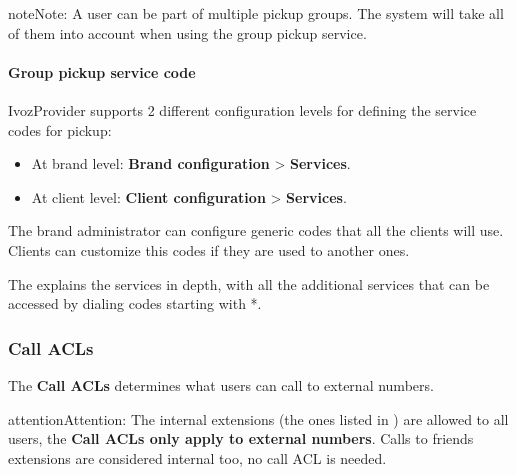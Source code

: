 \documentclass[letterpaper,10pt,english]{sphinxmanual}
\begin{document}
\begin{notice}{note}{Note:}
A user can be part of multiple pickup groups. The system will take
all of them into account when using the group pickup service.
\end{notice}


\paragraph{Group pickup service code}
\label{administration_portal/client/vpbx/user_configuration/pick_up_groups:group-pickup-service-code}
IvozProvider supports 2 different configuration levels for defining the service
codes for pickup:
\begin{itemize}
\item {} 
At brand level: \textbf{Brand configuration} \textgreater{} \textbf{Services}.

\item {} 
At client level: \textbf{Client configuration} \textgreater{} \textbf{Services}.

\end{itemize}

The brand administrator can configure generic codes that all the clients will
use. Clients can customize this codes if they are used to another ones.

The {\hyperref[administration_portal/client/vpbx/services:services]{}} explains the services in depth, with
all the additional services that can be accessed by dialing codes starting with
*.


\subsubsection{Call ACLs}
\label{administration_portal/client/vpbx/user_configuration/call_acls:call-permissions}\label{administration_portal/client/vpbx/user_configuration/call_acls::doc}\label{administration_portal/client/vpbx/user_configuration/call_acls:call-acls}
The \textbf{Call ACLs} determines what users can call to external numbers.

\begin{notice}{attention}{Attention:}
The internal extensions (the ones listed in {\hyperref[administration_portal/client/vpbx/extensions:extensions]{}}) are allowed to all users, the \textbf{Call
ACLs only apply to external numbers}. Calls to friends extensions are considered internal too, no call ACL is needed.
\end{notice}
\end{document}
